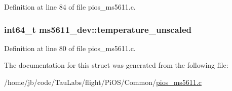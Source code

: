 \-Definition at line 84 of file pios\-\_\-ms5611.\-c.

\hypertarget{structms5611__dev_ae7a92929f9d2649ee5569f6f7b3227ed}{
\subsubsection[{temperature\-\_\-unscaled}]{\setlength{\rightskip}{0pt plus 5cm}int64\-\_\-t {\bf ms5611\-\_\-dev\-::temperature\-\_\-unscaled}}}\label{structms5611__dev_ae7a92929f9d2649ee5569f6f7b3227ed}


\-Definition at line 80 of file pios\-\_\-ms5611.\-c.



\-The documentation for this struct was generated from the following file\-:\begin{DoxyCompactItemize}
\item 
/home/jb/code/\-Tau\-Labs/flight/\-Pi\-O\-S/\-Common/\hyperlink{pios__ms5611_8c}{pios\-\_\-ms5611.\-c}\end{DoxyCompactItemize}
